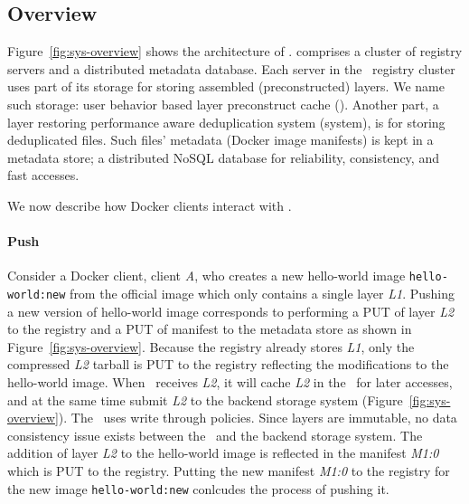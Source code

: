 \vspace{-4pt}
\subsection{Overview}
\label{sec:design}
\vspace{-4pt}



Figure~\ref{fig:sys-overview} shows the architecture of \sysname.
 \sysname comprises a cluster of registry servers and a distributed metadata database. 
Each server in the \sysname~registry cluster uses part of its storage for storing assembled (\ie preconstructed) layers. 
We name such storage: user behavior based layer preconstruct cache (\preconstructcachename).
Another part, a layer restoring performance %
aware deduplication system (\dedupname system), is for storing deduplicated files. 
Such files' metadata (\eg Docker image manifests) is kept in a metadata store; a distributed NoSQL database for 
reliability, consistency, and fast accesses.

We now describe how Docker clients interact with \sysname.

\paragraph{Push}

Consider a Docker client, client \textit{A}, who creates a new hello-world image
\texttt{hello-world:new}
from the official image which only contains a single layer \textit{L1}. 
Pushing a new version of hello-world image corresponds to performing a PUT of layer \textit{L2} to the registry and a PUT of manifest to the metadata store as shown in Figure~\ref{fig:sys-overview}. 
Because the registry already stores \textit{L1}, 
only the compressed \textit{L2} tarball is PUT to the registry reflecting the modifications to the hello-world image.
When \sysname~receives \textit{L2}, 
it will cache \textit{L2} in the \preconstructcachename~for later accesses,
and at the same time submit \textit{L2} to the backend storage system (Figure~\ref{fig:sys-overview}).
The \preconstructcachename~uses write through policies. 
Since layers are immutable, no data consistency issue exists between the \preconstructcachename~and the backend storage system.
The addition of layer \textit{L2} to the hello-world image is reflected in the manifest \textit{M1:0} which is PUT to the registry.
Putting the new manifest \textit{M1:0} to the registry for the new image \texttt{hello-world:new} conlcudes the process of pushing it.




